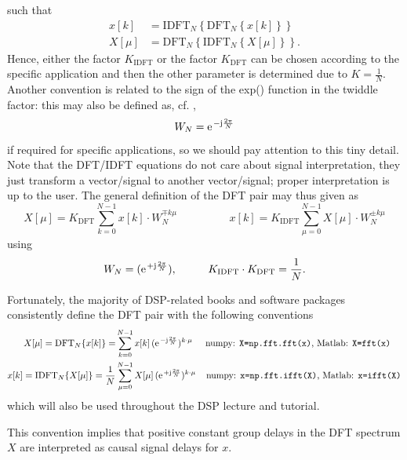 \documentclass[11pt,a4paper,DIV=12]{scrartcl}
\begin{document}
such that
\begin{align}
x[k]&=\text{IDFT}_N\left\{\text{DFT}_N\left\{x[k]\right\}\right\}
\label{eq:x_idft_dft_x}
\\
X[\mu]&=\text{DFT}_N\left\{\text{IDFT}_N\left\{X[\mu]\right\}\right\}.
\label{eq:X_dft_idft_X}
\end{align}
%
Hence, either the factor $K_{\text{IDFT}}$ or the factor $K_{\text{DFT}}$
can be chosen according to
the specific application and then the other parameter is determined due to
$K=\frac{1}{N}$.
%
Another convention is related to the sign of the exp() function in the twiddle
factor:
%
this may also be defined as, cf. \cite{Oppenheim2010},
\begin{equation}
W_N=\e^{-\im\frac{2\pi}{N}}
\end{equation}
if required for specific applications, so we should pay attention to this tiny detail.
%
Note that the DFT/IDFT equations do not care about signal interpretation, they
just transform a vector/signal to another vector/signal;
proper interpretation is up to the user.
%
The general definition of the DFT pair may thus given as
\begin{equation}
X[\mu]=K_\text{DFT}\sum_{k=0}^{N-1}x[k]\cdot W_N^{\mp k\mu}
\hspace{2cm}
x[k]=K_\text{IDFT}\sum_{\mu=0}^{N-1}X[\mu]\cdot W_N^{\pm k\mu}
\end{equation}
using
\begin{equation}
W_N=(\e^{+\im\frac{2\pi}{N}}),
\hspace{1cm}
K_\text{IDFT}\cdot K_\text{DFT}=\frac{1}{N}.
\end{equation}
%
\begin{framed}
%
Fortunately, the majority of DSP-related books and software packages consistently
define the DFT pair with the following conventions
\begin{align}
X[\mu] = \mathrm{DFT}_N\{x[k]\} = &\sum_{k=0}^{N-1} x[k] \, (\e^{-\im\frac{2\pi}{N}})^{k \cdot \mu}
\hspace{0.5cm}
\text{numpy: \texttt{X=np.fft.fft(x)}, Matlab: \texttt{X=fft(x)}}
\label{eq:DFT}\\
x[k] = \mathrm{IDFT}_N\{X[\mu]\} = \frac{1}{N} &\sum_{\mu=0}^{N-1} X[\mu] \, (\e^{+\im\frac{2\pi}{N}})^{k \cdot \mu}
\hspace{0.4cm}
\text{numpy: \texttt{x=np.fft.ifft(X)}, Matlab: \texttt{x=ifft(X)}}
\label{eq:IDFT}
\end{align}
which will also be used throughout the DSP lecture and tutorial.
%
\end{framed}
%
This convention implies that positive constant group delays in the DFT spectrum
$X$ are interpreted as causal signal delays for $x$.
\end{document}
